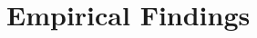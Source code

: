 \documentclass[12pt,letterpaper]{article}
\begin{document}
\section{Empirical Findings}\label{ef} %



% 


% 



%     
\end{document}
